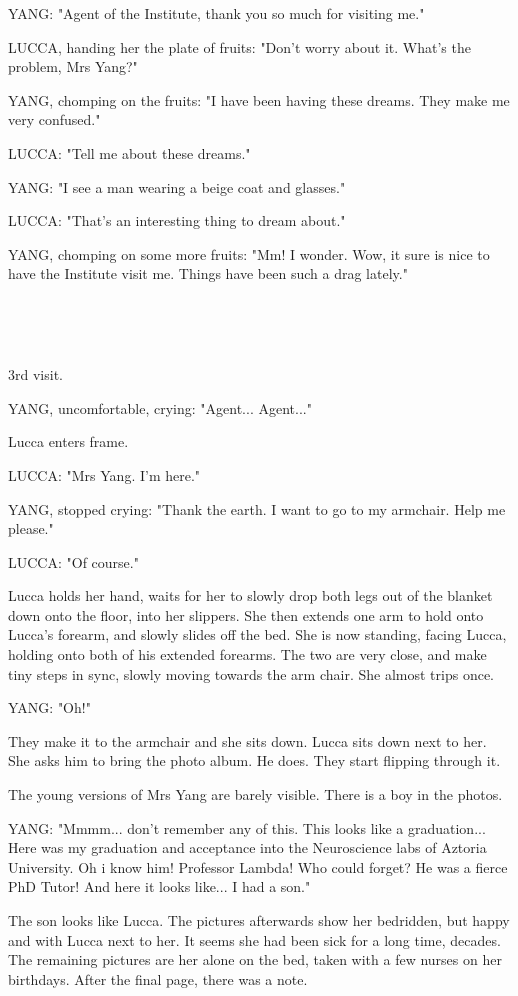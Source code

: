 \documentclass[11pt]{article}
\begin{document}
YANG: "Agent of the Institute, thank you so much for visiting me."

LUCCA, handing her the plate of fruits: "Don't worry about it.
What's the problem, Mrs Yang?"

YANG, chomping on the fruits: "I have been having these dreams. 
They make me very confused."

LUCCA: "Tell me about these dreams."

YANG: "I see a man wearing a beige coat and glasses."

LUCCA: "That's an interesting thing to dream about."

YANG, chomping on some more fruits: "Mm! I wonder.
Wow, it sure is nice to have the Institute visit me.
Things have been such a drag lately."

\ 

\ 

3rd visit.

YANG, uncomfortable, crying: "Agent... Agent..."

Lucca enters frame.

LUCCA: "Mrs Yang.
I'm here."

YANG, stopped crying: "Thank the earth.
I want to go to my armchair.
Help me please."

LUCCA: "Of course."

Lucca holds her hand, waits for her to slowly drop both legs out of the blanket down onto the floor, into her slippers.
She then extends one arm to hold onto Lucca's forearm, and slowly slides off the bed.
She is now standing, facing Lucca, holding onto both of his extended forearms.
The two are very close, and make tiny steps in sync, slowly moving towards the arm chair.
She almost trips once.

YANG: "Oh!"

They make it to the armchair and she sits down.
Lucca sits down next to her.
She asks him to bring the photo album. 
He does.
They start flipping through it.

The young versions of Mrs Yang are barely visible.
There is a boy in the photos. 

YANG: "Mmmm... don't remember any of this.
This looks like a graduation...
Here was my graduation and acceptance into the Neuroscience labs of Aztoria University.
Oh i know him! Professor Lambda! Who could forget? He was a fierce PhD Tutor!
And here it looks like...
I had a son."

The son looks like Lucca.
The pictures afterwards show her bedridden, but happy and with Lucca next to her.
It seems she had been sick for a long time, decades.
The remaining pictures are her alone on the bed, taken with a few nurses on her birthdays.
After the final page, there was a note.
\end{document}
